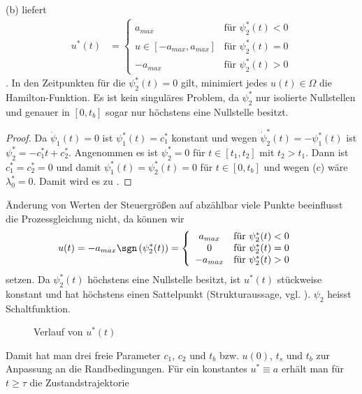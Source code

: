 \begin{exmp}
\begin{enumerate}[label=(\alph*)]
\end{enumerate}
(b) liefert 
\begin{align*}
u^{\ast}(t) & = \left\{\begin{array}{cl}
a_{max} & \text{für }\psi_2^{\ast}(t) < 0\\
u\in[-a_{max},a_{max}] & \text{für }\psi_2^{\ast}(t) = 0\\
-a_{max} & \text{für }\psi_2^{\ast}(t) > 0
\end{array} \right.
\end{align*}. In den Zeitpunkten für die $\psi_2^{\ast}(t)=0$ gilt, minimiert jedes $u(t)\in\Omega$ die Hamilton-Funktion. Es ist kein
singuläres Problem, da $\psi_2^{\ast}$ nur isolierte Nullstellen und genauer in $[0,t_b]$ sogar nur höchstens eine Nullstelle
besitzt.\begin{proof}
Da $\dot{\psi}_1(t)=0$ ist $\psi_1^{\ast}(t)=c_1^{\ast}$ konstant und wegen $\dot{\psi}_2^{\ast}(t)=-\psi_1^{\ast}(t)$ ist
$\psi_2^{\ast}=-c_1^{\ast}t+c_2^{\ast}$. Angenommen es ist $\psi_2^{\ast}=0$ für $t\in[t_1,t_2]$ mit $t_2>t_1$. Dann ist $c_1^{\ast}=c_2^{\ast}=0$ und
damit $\psi_1^{\ast}(t)=\psi_2^{\ast}(t)=0$ für $t\in[0,t_b]$ und wegen (c) wäre $\lambda_0^{\ast}=0$. Damit wird es zu
.
\end{proof}
Änderung von Werten der Steuergrößen auf abzählbar viele Punkte beeinflusst die Prozessgleichung nicht, da können wir 
\begin{align*}
	u(t) & = -a_{max}\sgn\left(\psi_2^{\ast}(t) \right) = \left\{\begin{array}{cl}
	a_{max} & \text{für }\psi_2^{\ast}(t) < 0\\
	0 & \text{für }\psi_2^{\ast}(t) = 0\\
	-a_{max} & \text{für }\psi_2^{\ast}(t) > 0
	\end{array} \right.
\end{align*}
setzen. Da $\psi_2^{\ast}(t)$ höchstens eine Nullstelle besitzt, ist $u^{\ast}(t)$ stückweise konstant und hat höchstens einen Sattelpunkt
(Strukturaussage, vgl. ). $\psi_2$ heisst Schaltfunktion.
\begin{figure}[htb]
	\centering
	
	\caption{Verlauf von $u^{\ast}(t)$}
	\label{fig:kap_2_bsp_1_uast_pont}
\end{figure}
Damit hat man drei freie Parameter $c_1$, $c_2$ und $t_b$ bzw. $u(0)$, $t_s$ und $t_b$ zur Anpassung an die Randbedingungen. Für ein konstantes
$u^{\ast}\equiv a$ erhält man für $t\geq \tau$ die Zustandstrajektorie

\end{exmp}

